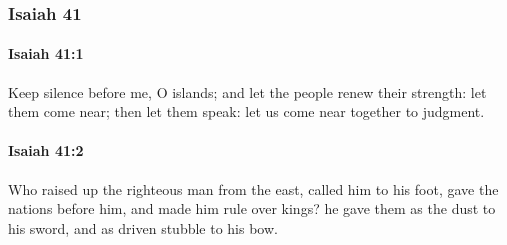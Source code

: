 	\subsubsection{Isaiah 41} %
		\label{ISAIAH-41}

		\paragraph{Isaiah 41:1} %
			\label{ISAIAH-41-1}

			Keep silence before me, O islands; and let the people renew their strength: let them come near; then let them speak: let us come near together to judgment.


		\paragraph{Isaiah 41:2} %
			\label{ISAIAH-41-2}

			Who raised up the righteous man from the east, called him to his foot, gave the nations before him, and made him rule over kings? he gave them as the dust to his sword, and as driven stubble to his bow.

